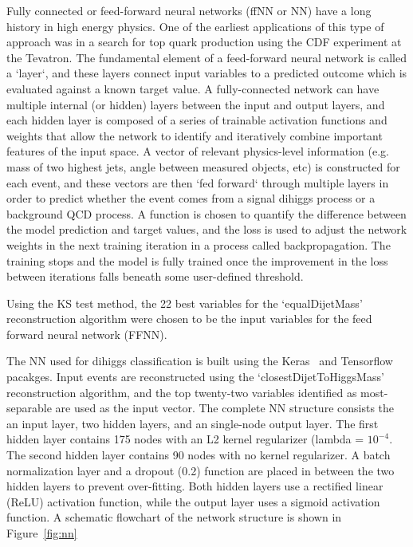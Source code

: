 \label{sec:NN}
Fully connected or feed-forward neural networks (ffNN or NN) have a long history in high energy physics. One of the earliest applications of this type of approach was in a search for top quark production using the CDF experiment at the Tevatron. The fundamental element of a feed-forward neural network is called a `layer`, and these layers connect input variables to a predicted outcome which is evaluated against a known target value. A fully-connected network can have multiple internal (or hidden) layers between the input and output layers, and each hidden layer is composed of a series of trainable activation functions and weights that allow the network to identify and iteratively combine important features of the input space. A vector of relevant physics-level information (e.g. mass of two highest \pt jets, angle between measured objects, etc) is constructed for each event, and these vectors are then `fed forward` through multiple layers in order to predict whether the event comes from a signal dihiggs process or a background QCD process. A function is chosen to quantify the difference between the model prediction and target values, and the loss is used to adjust the network weights in the next training iteration in a process called backpropagation. The training stops and the model is fully trained once the improvement in the loss between iterations falls beneath some user-defined threshold.


Using the KS test method, the 22 best variables for the ‘equalDijetMass’ reconstruction algorithm were chosen to be the input variables for the feed forward neural network (FFNN).

The NN used for dihiggs classification is built using the Keras~\cite{chollet2015keras} and Tensorflow~\cite{tensorflow} pacakges. Input events are reconstructed using the `closestDijetToHiggsMass’ reconstruction algorithm, and the top twenty-two variables identified as most-separable are used as the input vector. The complete NN structure consists the an input layer, two hidden layers, and an single-node output layer. The first hidden layer contains 175 nodes with an L2 kernel regularizer (lambda = $10^{-4}$. The second hidden layer contains 90 nodes with no kernel regularizer. A batch normalization layer and a dropout (0.2) function are placed in between the two hidden layers to prevent over-fitting. Both hidden layers use a rectified linear (ReLU) activation function, while the output layer uses a sigmoid activation function. A schematic flowchart of the network structure is shown in Figure~\ref{fig:nn}


